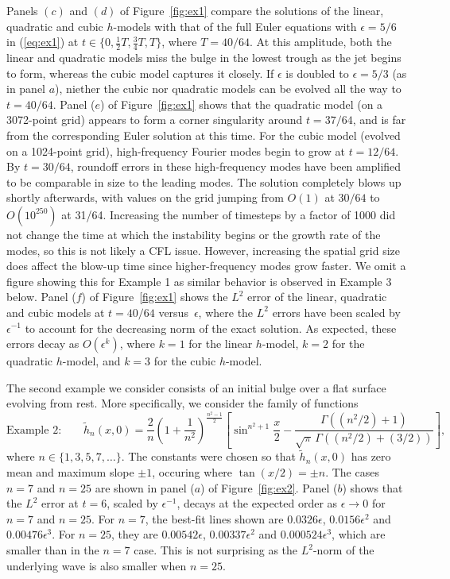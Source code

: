 \documentclass[11pt]{article}
\theoremstyle{plain}
\theoremstyle{definition}
\theoremstyle{definition}
\newcommand{\eps}{\epsilon}
\begin{document}
Panels $(c)$ and $(d)$ of Figure~\ref{fig:ex1} compare the solutions
of the linear, quadratic and cubic $h$-models with that of the full
Euler equations with $\eps=5/6$ in (\ref{eq:ex1}) at
$t\in\{0,\frac12T,\frac34T,T\}$, where $T=40/64$. At this amplitude,
both the linear and quadratic models miss the bulge in the lowest
trough as the jet begins to form, whereas the cubic model captures it
closely. If $\eps$ is doubled to $\eps=5/3$ (as in panel $a$), niether
the cubic nor quadratic models can be evolved all the way to
$t=40/64$. Panel ($e$) of Figure~\ref{fig:ex1} shows that the
quadratic model (on a 3072-point grid) appears to form a corner
singularity around $t=37/64$, and is far from the corresponding Euler
solution at this time. For the cubic model (evolved on a 1024-point
  grid), high-frequency Fourier modes begin to grow at $t=12/64$. By
$t=30/64$, roundoff errors in these high-frequency modes have been
amplified to be comparable in size to the leading modes.  The solution
completely blows up shortly afterwards, with values on the grid
jumping from $O(1)$ at $30/64$ to $O(10^{250})$ at 31/64. Increasing
the number of timesteps by a factor of 1000 did not change the time at
which the instability begins or the growth rate of the modes, so this
is not likely a CFL issue. However, increasing the spatial grid size
does affect the blow-up time since higher-frequency modes grow
faster. We omit a figure showing this for Example 1 as similar
behavior is observed in Example 3 below. Panel ($f$) of
Figure~\ref{fig:ex1} shows the $L^2$ error of the linear, quadratic
and cubic models at $t=40/64$ versus~$\eps$, where the $L^2$ errors
have been scaled by $\eps^{-1}$ to account for the decreasing norm
of the exact solution. As expected, these errors decay as
$O(\eps^k)$, where $k=1$ for the linear $h$-model, $k=2$ for the
quadratic $h$-model, and $k=3$ for the cubic $h$-model.



The second example we consider consists of an initial bulge over a
flat surface evolving from rest. More specifically, we consider the
family of functions
%
\begin{equation}
  \text{Example 2:}\qquad \tilde h_n(x,0) = \frac2n\left(1+\frac1{n^2}\right)^{\frac{n^2-1}2}
  \left[\sin^{n^2+1}\frac x2 - \frac{\Gamma((n^2/2)+1)}{\sqrt\pi\,\Gamma((n^2/2)+(3/2))}\right],
\end{equation}
%
where $n\in\{1,3,5,7,\dots\}$. The constants were chosen so that
$\tilde h_n(x,0)$ has zero mean and maximum slope $\pm1$, occuring
where $\tan(x/2)=\pm n$. The cases $n=7$ and $n=25$ are shown in panel
($a$) of Figure~\ref{fig:ex2}.  Panel ($b$) shows that the $L^2$ error
at $t=6$, scaled by $\eps^{-1}$, decays at the expected order as
$\eps\rightarrow0$ for $n=7$ and $n=25$. For $n=7$, the best-fit lines
shown are $0.0326\eps$, $0.0156\eps^2$ and $0.00476\eps^3$. For
$n=25$, they are $0.00542\eps$, $0.00337\eps^2$ and $0.000524\eps^3$,
which are smaller than in the $n=7$ case. This is not surprising as
the $L^2$-norm of the underlying wave is also smaller when $n=25$.
\end{document}
